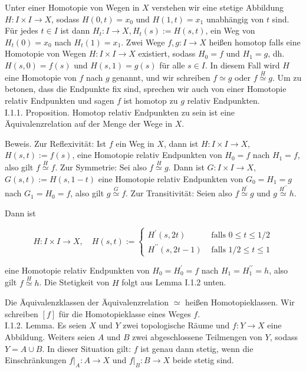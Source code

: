 \documentclass[10pt]{article}
\begin{document}
Unter einer Homotopie von Wegen in $X$ verstehen wir eine stetige Abbildung $H: I \times I \rightarrow X$, sodass $H(0, t)=x_{0}$ und $H(1, t)=x_{1}$ unabhängig von $t$ sind. Für jedes $t \in I$ ist dann $H_{t}: I \rightarrow X, H_{t}(s):=H(s, t)$, ein Weg von $H_{t}(0)=x_{0}$ nach $H_{t}(1)=x_{1}$. Zwei Wege $f, g: I \rightarrow X$ heißen homotop falls eine Homotopie von Wegen $H: I \times I \rightarrow X$ existiert, sodass $H_{0}=f$ und $H_{1}=g$, dh. $H(s, 0)=f(s)$ und $H(s, 1)=g(s)$ für alle $s \in I$. In diesem Fall wird $H$ eine Homotopie von $f$ nach $g$ genannt, und wir schreiben $f \simeq g$ oder $f \stackrel{H}{\simeq} g$. Um zu betonen, dass die Endpunkte fix sind, sprechen wir auch von einer Homotopie relativ Endpunkten und sagen $f$ ist homotop zu $g$ relativ Endpunkten.\\
I.1.1. Proposition. Homotop relativ Endpunkten zu sein ist eine Äquivalenzrelation auf der Menge der Wege in $X$.

Beweis. Zur Reflexivität: Ist $f$ ein Weg in $X$, dann ist $H: I \times I \rightarrow X$, $H(s, t):=f(s)$, eine Homotopie relativ Endpunkten von $H_{0}=f$ nach $H_{1}=f$, also gilt $f \stackrel{H}{\simeq} f$. Zur Symmetrie: Sei also $f \stackrel{H}{\simeq} g$. Dann ist $G: I \times I \rightarrow X$, $G(s, t):=H(s, 1-t)$ eine Homotopie relativ Endpunkten von $G_{0}=H_{1}=g$ nach $G_{1}=H_{0}=f$, also gilt $g \stackrel{G}{\simeq} f$. Zur Transitivität: Seien also $f \stackrel{H^{\prime}}{\simeq} g$ und $g \stackrel{H^{\prime \prime}}{\simeq} h$.

Dann ist

$$
H: I \times I \rightarrow X, \quad H(s, t):= \begin{cases}H^{\prime}(s, 2 t) & \text { falls } 0 \leq t \leq 1 / 2 \\ H^{\prime \prime}(s, 2 t-1) & \text { falls } 1 / 2 \leq t \leq 1\end{cases}
$$

eine Homotopie relativ Endpunkten von $H_{0}=H_{0}^{\prime}=f$ nach $H_{1}=H_{1}^{\prime \prime}=h$, also gilt $f \stackrel{H}{\simeq} h$. Die Stetigkeit von $H$ folgt aus Lemma I.1.2 unten.

Die Äquivalenzklassen der Äquivalenzrelation $\simeq$ heißen Homotopieklassen. Wir schreiben $[f]$ für die Homotopieklasse eines Weges $f$.\\
I.1.2. Lemma. Es seien $X$ und $Y$ zwei topologische Räume und $f: Y \rightarrow X$ eine Abbildung. Weiters seien $A$ und $B$ zwei abgeschlossene Teilmengen von $Y$, sodass $Y=A \cup B$. In dieser Situation gilt: $f$ ist genau dann stetig, wenn die Einschränkungen $\left.f\right|_{A}: A \rightarrow X$ und $\left.f\right|_{B}: B \rightarrow X$ beide stetig sind.
\end{document}

